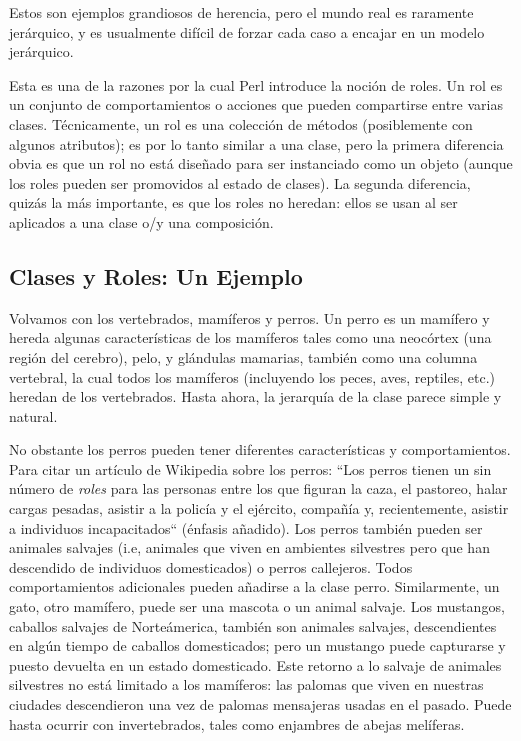 Estos son ejemplos grandiosos de herencia, pero el mundo real es
raramente jerárquico, y es usualmente difícil de forzar cada caso 
a encajar en un modelo jerárquico.

Esta es una de la razones por la cual Perl introduce la noción
de roles. Un rol es un conjunto de comportamientos o acciones
que pueden compartirse entre varias clases. Técnicamente, un rol
es una colección de métodos (posiblemente con algunos atributos);
es por lo tanto similar a una clase, pero la primera diferencia
obvia es que un rol no está diseñado para ser instanciado como
un objeto (aunque los roles pueden ser promovidos al estado de
clases). La segunda diferencia, quizás la más importante, es que los
roles no heredan: ellos se usan al ser aplicados a una clase 
o/y una composición.

\subsection{Clases y Roles: Un Ejemplo}

  
Volvamos con los vertebrados, mamíferos y perros. Un perro
es un mamífero y hereda algunas características de los 
mamíferos tales como una neocórtex (una región del cerebro),
pelo, y glándulas mamarias, también como una columna vertebral,
la cual todos los mamíferos (incluyendo los peces, aves, reptiles, etc.)
heredan de los vertebrados. Hasta ahora, la jerarquía de la clase
parece simple y natural.

No obstante los perros pueden tener diferentes características y
comportamientos. Para citar un artículo de Wikipedia sobre los perros:
``Los perros tienen un sin número de \emph{roles} para las personas
entre los que figuran la caza, el pastoreo, halar cargas pesadas, asistir
a la policía y el ejército, compañía y, recientemente, asistir a
individuos incapacitados`` (énfasis añadido). Los perros también pueden 
ser animales salvajes (i.e, animales que viven en ambientes silvestres
pero que han descendido de individuos domesticados) o perros callejeros.
Todos comportamientos adicionales pueden añadirse a la clase perro.
Similarmente, un gato, otro mamífero, puede ser una mascota o
un animal salvaje. Los mustangos, caballos salvajes de Norteámerica,
también son animales salvajes, descendientes en algún tiempo de caballos
domesticados; pero un mustango puede capturarse y puesto devuelta
en un estado domesticado. Este retorno a lo salvaje de animales
silvestres no está limitado a los mamíferos: las palomas que viven
en nuestras ciudades descendieron una vez de palomas mensajeras
usadas en el pasado. Puede hasta ocurrir con invertebrados, tales
como enjambres de abejas melíferas.

